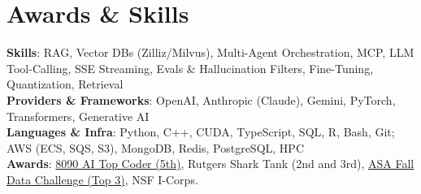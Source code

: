 \documentclass[letterpaper,11pt]{article}
\begin{document}
\section{Awards \& Skills}
 \begin{itemize}[leftmargin=0.15in, label={}]
    \small{\item{
     \textbf{Skills}{: RAG, Vector DBs (Zilliz/Milvus), Multi-Agent Orchestration, MCP, LLM Tool-Calling, SSE Streaming, Evals \& Hallucination Filters, Fine-Tuning, Quantization, Retrieval} \\
     \textbf{Providers \& Frameworks}{: OpenAI, Anthropic (Claude), Gemini, PyTorch, Transformers, Generative AI} \\
     \textbf{Languages \& Infra}{: Python, C++, CUDA, TypeScript, SQL, R, Bash, Git; AWS (ECS, SQS, S3), MongoDB, Redis, PostgreSQL, HPC} \\
     \textbf{Awards}{: \href{https://github.com/AkeBoss-tech/top-coder-challenge}{8090 AI Top Coder (5th)}, Rutgers Shark Tank (2nd and 3rd), \href{https://acashmoney.biz/portfolio/asa-fall-data/}{ASA Fall Data Challenge (Top 3)}, NSF I-Corps.}
    }}
 \end{itemize}
\end{document}
